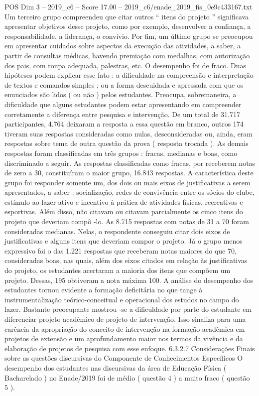 \begin{textsample}{POS Dim 3 – 2019\_c6 – Score 17.00 – 2019\_c6/enade\_2019\_fis\_0e9c433167.txt}
Um terceiro grupo compreendeu que citar outros “ itens do projeto ” significava apresentar objetivos desse projeto, como por exemplo, desenvolver a confiança, a responsabilidade, a liderança, o convívio.
Por fim, um último grupo se preocupou em apresentar cuidados sobre aspectos da execução das atividades, a saber, a partir de consultas médicas, havendo premiação com medalhas, com autorização dos pais, com roupa adequada, palestras, etc.
O desempenho foi de fraco.
Duas hipóteses podem explicar esse fato : a dificuldade na compreensão e interpretação de textos e comandos simples ; ou a forma descuidada e apressada com que os enunciados são lidos ( ou não ) pelos estudantes.
Preocupa, sobremaneira, a dificuldade que alguns estudantes podem estar apresentando em compreender corretamente a diferença entre pesquisa e intervenção.
De um total de 31.717 participantes, 4.764 deixaram a resposta a essa questão em branco, outros 174 tiveram suas respostas consideradas como nulas, desconsideradas ou, ainda, eram respostas sobre tema de outra questão da prova ( resposta trocada ).
As demais respostas foram classificadas em três grupos : fracas, medianas e boas, como discriminado a seguir.
As respostas classificadas como fracas, por receberem notas de zero a 30, constituíram o maior grupo, 16.843 respostas.
A característica deste grupo foi responder somente um, dos dois ou mais eixos de justificativas a serem apresentados, a saber : socialização, redes de convivência entre os sócios do clube, estímulo ao lazer ativo e incentivo à prática de atividades físicas, recreativas e esportivas.
Além disso, não citavam ou citavam parcialmente os cinco itens do projeto que deveriam compô -lo.
As 8.715 respostas com notas de 31 a 70 foram consideradas medianas.
Nelas, o respondente conseguiu citar dois eixos de justificativas e alguns itens que deveriam compor o projeto.
Já o grupo menos expressivo foi o das 1.221 respostas que receberam notas maiores do que 70, consideradas boas, nas quais, além dos eixos citados em relação às justificativas do projeto, os estudantes acertaram a maioria dos itens que compõem um projeto.
Dessas, 195 obtiveram a nota máxima 100.
A análise do desempenho dos estudantes tornou evidente a formação deficitária no que tange à instrumentalização teórico-conceitual e operacional dos estudos no campo do lazer.
Bastante preocupante mostrou -se a dificuldade por parte do estudante em diferenciar projeto acadêmico de projeto de intervenção.
Isso sinaliza para uma carência da apropriação do conceito de intervenção na formação acadêmica em projetos de extensão e um aprofundamento maior nos termos da vivência e da elaboração de projetos de pesquisa com esse enfoque. 6.3.2.7 Considerações Finais sobre as questões discursivas do Componente de Conhecimentos Específicos O desempenho dos estudantes nas discursivas da área de Educação Física ( Bacharelado ) no Enade/2019 foi de médio ( questão 4 ) a muito fraco ( questão 5 ).

\end{textsample}
